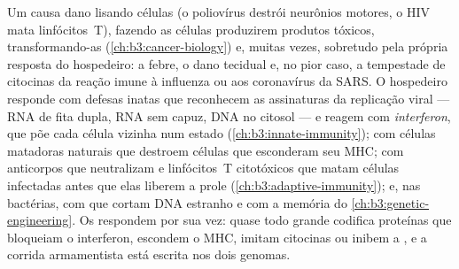 \begin{proposition}\label{prop:b3:virology:pathogenesis}
Um  causa dano lisando células (o poliovírus destrói neurônios
motores, o HIV mata linfócitos~T), fazendo as células produzirem
produtos tóxicos, transformando-as (\cref{ch:b3:cancer-biology}) e,
muitas vezes, sobretudo pela própria resposta do hospedeiro: a febre, o
dano tecidual e, no pior caso, a tempestade de citocinas da reação
imune à influenza ou aos coronavírus da SARS. O hospedeiro responde com
defesas inatas que reconhecem as assinaturas da replicação viral ---
RNA de fita dupla, RNA sem capuz, DNA no citosol --- e reagem com
\emph{interferon}, que põe cada célula vizinha num estado 
(\cref{ch:b3:innate-immunity}); com células matadoras naturais que
destroem células que esconderam seu MHC; com anticorpos que neutralizam
 e linfócitos~T citotóxicos que matam células infectadas antes
que elas liberem a prole (\cref{ch:b3:adaptive-immunity}); e, nas
bactérias, com  que cortam DNA estranho e com a
memória  do \cref{ch:b3:genetic-engineering}. Os  respondem
por sua vez: quase todo  grande codifica proteínas que bloqueiam o
interferon, escondem o MHC, imitam citocinas ou inibem a , e a
corrida armamentista está escrita nos dois genomas.
\end{proposition}

